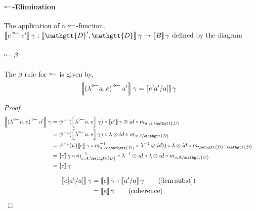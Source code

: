 \documentclass[acmsmall,nonacm]{acmart}
\renewcommand{\Delta}{\mathgtt{D}}
\newcommand{\sem}[1]{\left\llbracket{#1}\right\rrbracket}
\newcommand{\semg}[1]{\sem{#1}\gamma}
\newcommand{\lto}{\multimap}
\newcommand{\tol}{\mathrel{\rotatebox[origin=c]{180}{$\lto$}}}
\newcommand{\lambtol}[2]{\lambda^{{\tol}} #1.\, #2}
\newcommand{\apptol}[2]{#1 \mathop{{}^{\tol}} #2}
\begin{document}
\begin{center}
\end{center}

\paragraph{$\tol$-Elimination}
The application of a $\tol$-function,
$\semg{\apptol {e} {e'}} : \semg{\Delta',\Delta} \to \semg{B}$ defined by the diagram

\begin{center}
\end{center}

\paragraph{$\tol\beta$}
The $\beta$ rule for $\tol$ is given by,
\[
  \semg{\apptol {(\lambtol {a} {e})} {a'}} = \semg{e[a'/a]}
\]
\begin{proof}
\begin{align*}
  \semg{\apptol {(\lambtol {a} {e})} {a'}}
  & = \psi^{{-1}}(\semg{\lambtol {a} {e}}) \circ \semg{a'} \otimes id \circ m_{a:A,\Delta} \\
  & = \psi^{{-1}}(\semg{\lambtol {a} {e}}) \circ \lambda \otimes id \circ m_{a:A,\Delta} \\
  & = \psi^{{-1}}(\psi(\semg{e} \circ m^{-1}_{a:A,\Delta} \circ \lambda^{-1} \otimes id)) \circ \lambda \otimes id \circ m_{\Delta',\Delta} \\
  & = \semg{e} \circ m^{-1}_{a:A,\Delta} \circ \lambda^{-1} \otimes id \circ \lambda \otimes id \circ m_{a:A,\Delta} \\
  & = \semg{e}
\end{align*}

\begin{align*}
  \semg{e[a'/a]}
  & = \semg{e} \circ \semg{a'/a} \tag{\cref{lem:subst}} \\
  & = \semg{e} \tag{coherence}
\end{align*}
\end{proof}
\end{document}
